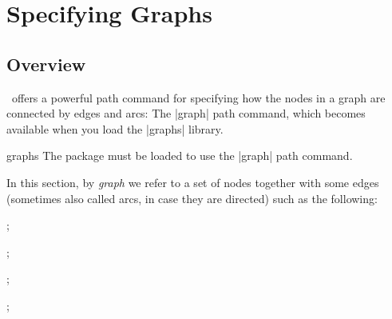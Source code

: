%
%
%


\section{Specifying Graphs}
\label{section-library-graphs}

\subsection{Overview}

\tikzname\ offers a powerful path command for specifying how the nodes in a
graph are connected by edges and arcs: The |graph| path command, which becomes
available when you load the |graphs| library.

\begin{tikzlibrary}{graphs}
    The package must be loaded to use the |graph| path command.
\end{tikzlibrary}

In this section, by \emph{graph} we refer to a set of nodes together with some
edges (sometimes also called arcs, in case they are directed) such as the
following:
%
\begin{codeexample}[preamble={\usetikzlibrary{graphs}}]
\tikz {};
\end{codeexample}

\begin{codeexample}[preamble={\usetikzlibrary{graphs.standard}}]
\tikz {};
\end{codeexample}

\begin{codeexample}[preamble={\usetikzlibrary{graphs}}]
\tikz
  ;
\end{codeexample}

\begin{codeexample}[
    preamble={\usetikzlibrary{graphs}},
    pre={\definecolor{graphicbackground}{rgb}{0.96,0.96,0.8}},
]
\tikz
  ;
\end{codeexample}

